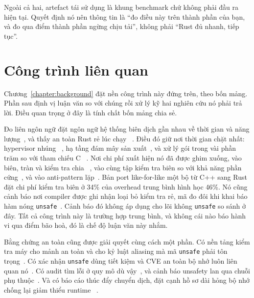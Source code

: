 Ngoài cả hai, artefact tái sử dụng là khung benchmark chứ không phải đầu ra
hiện tại. Quyết định nó nên thông tin là ``đo điều này trên thành phần của bạn, và đo qua
điểm thành phần ngừng chịu tải'', không phải ``Rust đủ nhanh, tiếp tục''.

\section{Công trình liên quan}\label{sec:relatedwork}
Chương~\ref{chapter:background} đặt nền công trình này đứng trên, theo bốn mảng. Phần
sau định vị luận văn so với chúng rồi xử lý kỹ hai nghiên cứu nó phải
trả lời. Điều quan trọng ở đây là tính chất bốn mảng chia sẻ.

Đo liên ngôn ngữ đặt ngôn ngữ hệ thống biên dịch gần nhau về thời gian và
năng lượng~\cite{bugden2022rust,pereira2017energy}, và thấy an toàn Rust rẻ lúc chạy
~\cite{balasubramanian2017rust,levy2017kernel}. Điều đó giữ nơi thời gian chặt nhất: hypervisor nhúng
~\cite{mo2023rustshyper}, hạ tầng đám mây sản xuất~\cite{agache2020firecracker},
và xử lý gói trong vài phần trăm so với tham chiếu C
~\cite{emmerich2019drivers,xiao2024rpkt}. Nơi chi phí xuất hiện nó đã được ghim
xuống, vào biên, tràn và kiểm tra chia
~\cite{zhang2022runtime}, vào cùng tập kiểm tra biên
so với khả năng phần cứng~\cite{harris2023morello}, và vào anti-pattern
lặp~\cite{cui2025perfbugs}. Bản port like-for-like một bộ từ C++ sang Rust đặt
chi phí kiểm tra biên ở 34\% của overhead trung bình hình học 46\%. Nó cũng cảnh báo nơi compiler được ghi nhận loại bỏ kiểm tra rẻ, mã đo đôi khi khai báo
hàm nóng \texttt{unsafe}~\cite{naylor2026cherisimt}. Cảnh báo đó không áp dụng cho
lõi không \texttt{unsafe} so sánh ở đây. Tất cả công trình này là trường hợp trung bình, và không cái nào báo
hành vi qua điểm bão hoà, đó là chế độ luận văn này nhắm.

Bằng chứng an toàn cũng được giải quyết cùng cách một phần. Có nền tảng kiểm tra máy cho
mảnh an toàn và cho kỷ luật aliasing mà mã \texttt{unsafe} phải
tôn trọng~\cite{jung2018rustbelt,jung2021safe,jung2020stacked}. Có xác nhận
\texttt{unsafe} dùng tiết kiệm và CVE an toàn bộ nhớ luôn liên quan
nó~\cite{qin2020rust,astrauskas2020unsafe,xu2021rustcve}. Có audit tìm
lỗi ở quy mô dù vậy~\cite{bae2021rudra,zheng2024security,qin2024safety}, và cảnh báo
unsafety lan qua chuỗi phụ thuộc~\cite{evans2020rust}. Và có báo cáo
thúc đẩy chuyển dịch, đặt cạnh hồ sơ dài hỏng bộ nhớ chống lại giảm thiểu runtime
~\cite{msrc2019memory,google2022android,google2024securebydesign,cisa2023memorysafe,oncd2024building,szekeres2013sok}.

